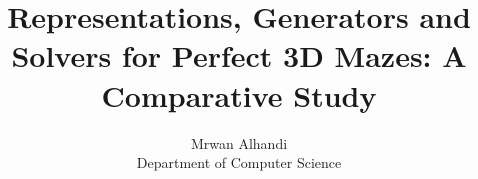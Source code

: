 \documentclass{article}
\title{Representations, Generators and Solvers for Perfect 3D Mazes: A Comparative Study}
\author{%
  Mrwan Alhandi \\
  Department of Computer Science \\
}
\begin{document}
\maketitle

\begin{abstract}
  
\end{abstract}





\end{document}
